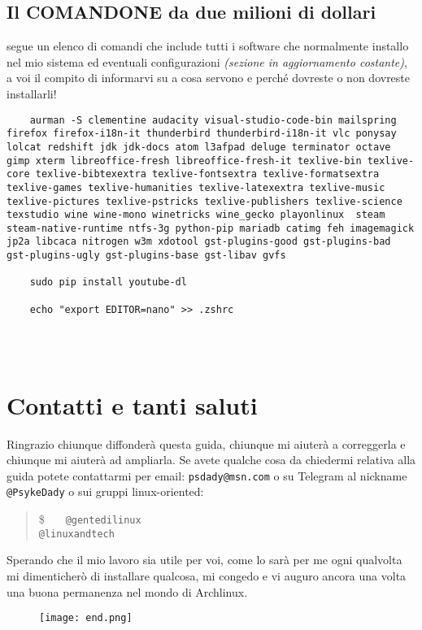 \documentclass[twoside,italian]{book}
\newcommand{\code}[1]{\texttt{#1}}
\newcommand{\shellcode}[1]{\$$\quad$ \texttt{#1}}
\newcommand{\centcode}[1]{
	\begin{quote}
		\color{code}
		\shellcode{#1}
	\end{quote}
}
\begin{document}
		\section{Il COMANDONE da due milioni di dollari}
			segue un elenco di comandi che include tutti i software che normalmente installo nel mio sistema ed eventuali configurazioni \textit{(sezione in aggiornamento costante)}, a voi il compito di informarvi su a cosa servono e perché dovreste o non dovreste installarli!
\begin{lstlisting}
	aurman -S clementine audacity visual-studio-code-bin mailspring firefox firefox-i18n-it thunderbird thunderbird-i18n-it vlc ponysay lolcat redshift jdk jdk-docs atom l3afpad deluge terminator octave gimp xterm libreoffice-fresh libreoffice-fresh-it texlive-bin texlive-core texlive-bibtexextra texlive-fontsextra texlive-formatsextra texlive-games texlive-humanities texlive-latexextra texlive-music texlive-pictures texlive-pstricks texlive-publishers texlive-science texstudio wine wine-mono winetricks wine_gecko playonlinux  steam steam-native-runtime ntfs-3g python-pip mariadb catimg feh imagemagick jp2a libcaca nitrogen w3m xdotool gst-plugins-good gst-plugins-bad gst-plugins-ugly gst-plugins-base gst-libav gvfs 
	
	sudo pip install youtube-dl
	
	echo "export EDITOR=nano" >> .zshrc
	
	
	
\end{lstlisting}


	\chapter{Contatti e tanti saluti}
		Ringrazio chiunque diffonderà questa guida, chiunque mi aiuterà a correggerla e chiunque mi aiuterà ad ampliarla. 
		Se avete qualche cosa da chiedermi relativa alla guida potete contattarmi per email: \code{psdady@msn.com} o su Telegram al nickname \code{@PsykeDady} o sui gruppi linux-oriented: \centcode{
			@gentedilinux\\
			  @linuxandtech
		}		
		
		Sperando che il mio lavoro sia utile per voi, come lo sarà per me ogni qualvolta mi dimenticherò di installare qualcosa, mi congedo e vi auguro ancora una volta una  buona permanenza nel mondo di Archlinux.
		\newpage
		\begin{figure}[p]
			\centering
			\texttt{[image: end.png]}
		\end{figure}
					
			
\end{document}
